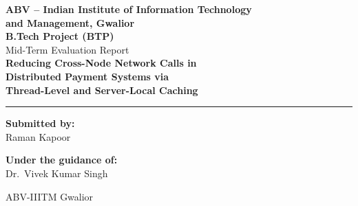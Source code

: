 \documentclass[12pt,a4paper]{report}
\begin{document}
\begin{titlepage}
\centering

\vspace*{1cm}
{\Large\bfseries ABV -- Indian Institute of Information Technology\\
and Management, Gwalior}\\[1.5cm]

{\LARGE\bfseries B.Tech Project (BTP)}\\[0.4cm]
{\Large Mid-Term Evaluation Report}\\[1.5cm]

{\large\bfseries Reducing Cross-Node Network Calls in\\
Distributed Payment Systems via\\
Thread-Level and Server-Local Caching}\\[2cm]

\hrule
\vspace{1cm}

\begin{minipage}[t]{0.45\textwidth}
\raggedright
\textbf{Submitted by:}\\[0.3cm]
Raman Kapoor\\
\end{minipage}
\hfill
\begin{minipage}[t]{0.45\textwidth}
\raggedleft
\textbf{Under the guidance of:}\\[0.3cm]
Dr.\ Vivek Kumar Singh
\end{minipage}

\vfill
{\large ABV-IIITM Gwalior}

\end{titlepage}
\end{document}
